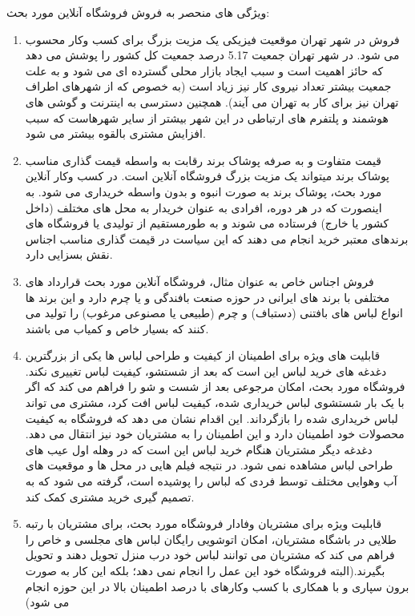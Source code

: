 \documentclass[14pt]{article}
\begin{document}
\begin{flushright}
ویژگی های منحصر به فروش فروشگاه آنلاین مورد بحث:
\begin{enumerate}
\item فروش در شهر تهران
\newline
موقعیت فیزیکی یک مزیت بزرگ برای کسب وکار محسوب می شود. در شهر تهران جمعیت 5.17 درصد جمعیت کل کشور را پوشش می دهد که حائز اهمیت است و سبب ایجاد بازار محلی گسترده ای می شود و به علت جمعیت بیشتر تعداد نیروی کار نیز زیاد است (به خصوص که از شهرهای اطراف تهران نیز برای کار به تهران می آیند). همچنین دسترسی به اینترنت و گوشی های هوشمند و پلتفرم های ارتباطی در این شهر بیشتر از سایر شهرهاست که سبب افزایش مشتری بالقوه بیشتر می شود. 

\item قیمت متفاوت و به صرفه پوشاک برند
\newline
رقابت به واسطه قیمت گذاری مناسب پوشاک برند میتواند یک مزیت بزرگ فروشگاه آنلاین است. در کسب وکار آنلاین مورد بحث، پوشاک برند به صورت انبوه و بدون واسطه خریداری می شود. به اینصورت که در هر دوره، افرادی به عنوان خریدار به محل های مختلف (داخل کشور یا خارج) فرستاده می شوند و به طورمستقیم از تولیدی یا فروشگاه های برندهای معتبر خرید انجام می دهند که این سیاست در قیمت گذاری مناسب اجناس نقش بسزایی دارد.

\item فروش اجناس خاص
\newline
به عنوان مثال، فروشگاه آنلاین مورد بحث قرارداد های مختلفی با برند های ایرانی در حوزه صنعت بافندگی و یا چرم دارد و این برند ها انواع لباس های بافتنی (دستباف) و چرم (طبیعی یا مصنوعی مرغوب) را تولید می کنند که بسیار خاص و کمیاب می باشند.
\item قابلیت های ویژه برای اطمینان از کیفیت و طراحی لباس ها
\newline
یکی از بزرگترین دغدغه های خرید لباس این است که بعد از شستشو، کیفیت لباس تغییری نکند. فروشگاه مورد بحث، امکان مرجوعی بعد از شست و شو را فراهم می کند که اگر با یک بار شستشوی لباس خریداری شده، کیفیت لباس افت کرد، مشتری می تواند لباس خریداری شده را بازگرداند. این اقدام نشان می دهد که فروشگاه به کیفیت محصولات خود اطمینان دارد و این اطمینان را به مشتریان خود نیز انتقال می دهد.
دغدغه دیگر مشتریان هنگام خرید لباس این است که در وهله اول عیب های طراحی لباس مشاهده نمی شود. در نتیجه فیلم هایی در محل ها و موقعیت های آب وهوایی مختلف توسط فردی که لباس را پوشیده است، گرفته می شود که به تصمیم گیری خرید مشتری کمک کند.

\item قابلیت ویژه برای مشتریان وفادار
\newline
فروشگاه مورد بحث، برای مشتریان با رتبه طلایی در باشگاه مشتریان، امکان اتوشویی رایگان لباس های مجلسی و خاص را فراهم می کند که مشتریان می توانند لباس خود درب منزل تحویل دهند و تحویل بگیرند.(البته فروشگاه خود این عمل را انجام نمی دهد؛ بلکه این کار به صورت برون سپاری و با همکاری با کسب وکارهای با درصد اطمینان بالا در این حوزه انجام می شود)


\end{enumerate}
\end{flushright}
\end{document}
